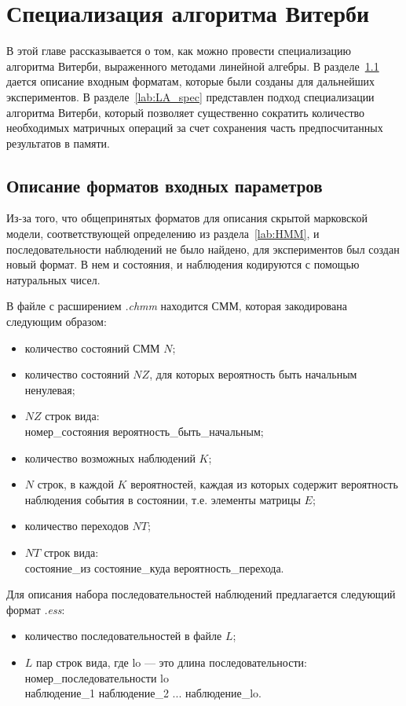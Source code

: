 \section{Специализация алгоритма Витерби}
В этой главе рассказывается о том, как можно провести специализацию алгоритма Витерби, выраженного методами линейной алгебры.
В разделе~\ref{lab:formats} дается описание входным форматам, 
которые были созданы для дальнейших экспериментов.
В разделе~\ref{lab:LA_spec} представлен подход специализации 
алгоритма Витерби, который позволяет существенно сократить 
количество необходимых матричных операций за счет сохранения 
часть предпосчитанных результатов в памяти.

\subsection{Описание форматов входных параметров}
\label{lab:formats}
Из-за того, что общепринятых форматов для описания скрытой 
марковской модели, соответствующей определению из 
раздела~\ref{lab:HMM}, и последовательности наблюдений не 
было найдено, для экспериментов был создан новый формат.
В нем и состояния, и наблюдения кодируются с помощью 
натуральных чисел.

В файле с расширением \emph{.chmm} находится СММ, которая закодирована следующим образом:
\begin{itemize}
	\item количество состояний СММ $N$;
	\item количество состояний $NZ$, для которых вероятность быть начальным ненулевая;
	\item $NZ$ строк вида:\\ 
	номер\_состояния вероятность\_быть\_начальным;
	\item количество возможных наблюдений $K$;
	\item $N$ строк, в каждой $K$ вероятностей, каждая из которых содержит вероятность наблюдения события в состоянии, т.е. элементы матрицы $E$;
	\item количество переходов $NT$;
	\item $NT$ строк вида:\\ состояние\_из состояние\_куда вероятность\_перехода.
\end{itemize}

Для описания набора последовательностей наблюдений 
предлагается следующий формат \emph{.ess}:
\begin{itemize}
	\item количество последовательностей в файле $L$;
	\item $L$ пар строк вида, где lo --- это длина последовательности:\\
	номер\_последовательности lo\\
	наблюдение\_1 наблюдение\_2 ... наблюдение\_lo.
\end{itemize}

